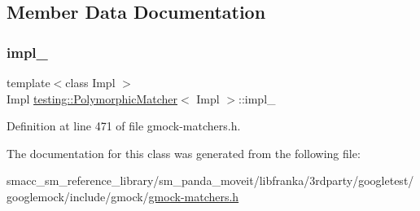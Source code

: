 \subsection{Member Data Documentation}
\mbox{\label{classtesting_1_1PolymorphicMatcher_adadea4f2c7b639586ed2f21b27303382}} 
\subsubsection{\texorpdfstring{impl\+\_\+}{impl\_}}
{\footnotesize\ttfamily template$<$class Impl $>$ \\
Impl \hyperlink{classtesting_1_1PolymorphicMatcher}{testing\+::\+Polymorphic\+Matcher}$<$ Impl $>$\+::impl\+\_\+\hspace{0.3cm}{\ttfamily [private]}}



Definition at line 471 of file gmock-\/matchers.\+h.



The documentation for this class was generated from the following file\+:\begin{DoxyCompactItemize}
\item 
smacc\+\_\+sm\+\_\+reference\+\_\+library/sm\+\_\+panda\+\_\+moveit/libfranka/3rdparty/googletest/googlemock/include/gmock/\hyperlink{gmock-matchers_8h}{gmock-\/matchers.\+h}\end{DoxyCompactItemize}
